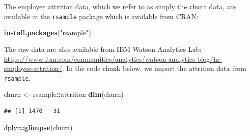 \documentclass[]{book}
\newenvironment{Shaded}{\begin{snugshade}}{\end{snugshade}}
\newcommand{\KeywordTok}[1]{\textcolor[rgb]{0.13,0.29,0.53}{\textbf{#1}}}
\newcommand{\NormalTok}[1]{#1}
\newcommand{\OperatorTok}[1]{\textcolor[rgb]{0.81,0.36,0.00}{\textbf{#1}}}
\newcommand{\StringTok}[1]{\textcolor[rgb]{0.31,0.60,0.02}{#1}}
\theoremstyle{definition}
\theoremstyle{definition}
\theoremstyle{definition}
\theoremstyle{remark}
\begin{document}
The employee attrition data, which we refer to as simply the
\texttt{churn} data, are available in the \texttt{rsample} package
\citep{pkg-rsample} which is available from CRAN:

\begin{Shaded}
\begin{Highlighting}[]
\KeywordTok{install.packages}\NormalTok{(}\StringTok{"rsample"}\NormalTok{)}
\end{Highlighting}
\end{Shaded}

The raw data are also available from IBM Watson Analytics Lab:
\url{https://www.ibm.com/communities/analytics/watson-analytics-blog/hr-employee-attrition/}.
In the code chunk below, we import the attrition data from
\texttt{rsample}.

\begin{Shaded}
\begin{Highlighting}[]
\NormalTok{churn <-}\StringTok{ }\NormalTok{rsample}\OperatorTok{::}\NormalTok{attrition}
\KeywordTok{dim}\NormalTok{(churn)}
\end{Highlighting}
\end{Shaded}

\begin{verbatim}
## [1] 1470   31
\end{verbatim}

\begin{Shaded}
\begin{Highlighting}[]
\NormalTok{dplyr}\OperatorTok{::}\KeywordTok{glimpse}\NormalTok{(churn)}
\end{Highlighting}
\end{Shaded}
\end{document}
